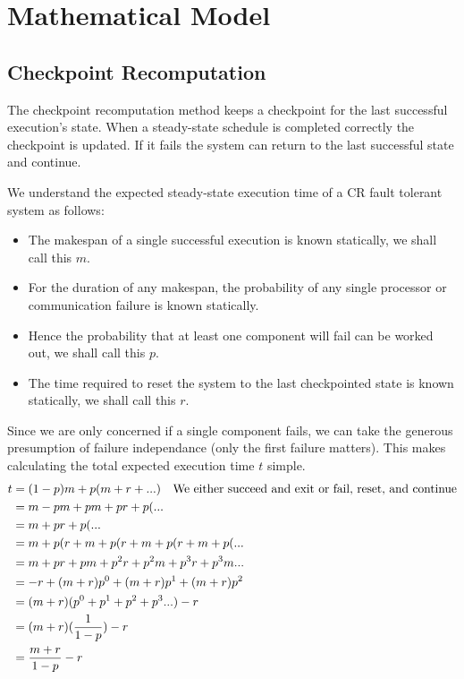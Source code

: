 \section{Mathematical Model}

\subsection{Checkpoint Recomputation}
The checkpoint recomputation method keeps a checkpoint for the last successful execution's state.
When a steady-state schedule is completed correctly the checkpoint is updated.
If it fails the system can return to the last successful state and continue.

We understand the expected steady-state execution time of a CR fault tolerant system as follows:
\begin{itemize}
	\item The makespan of a single successful execution is known statically, we shall call this $m$.
	\item For the duration of any makespan, the probability of any single processor or communication failure is known statically.
	\item Hence the probability that at least one component will fail can be worked out, we shall call this $p$.
	\item The time required to reset the system to the last checkpointed state is known statically, we shall call this $r$.
\end{itemize}

Since we are only concerned if a single component fails, we can take the generous presumption of failure independance (only the first failure matters).
This makes calculating the total expected execution time $t$ simple.
\begin{align}
	\nonumber t & = (1-p)m + p(m + r + ...) \quad \mbox{We either succeed and exit or fail, reset, and continue} \\
	\nonumber & = m - pm + pm + pr + p(... \\
	\nonumber & = m + pr + p(... \\
	\nonumber & = m + p(r + m + p(r + m + p(r + m + p(...\\
	\nonumber & = m + pr + pm + p^2r + p^2m + p^3r + p^3m ...\\
	\nonumber & = -r + (m+r)p^0 + (m+r)p^1 + (m+r)p^2\\
	\nonumber & = (m+r)(p^0 + p^1 + p^2 + p^3 ...) - r\\
	\nonumber & = (m+r)({{1}\over{1-p}}) - r\\
	\nonumber & = {{m+r}\over{1-p}} - r
\end{align}